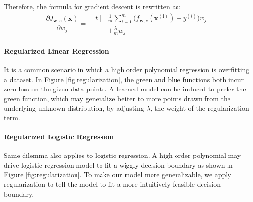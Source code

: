 \documentclass[12pt, twoside]{article}
\begin{document}
\begin{multicols*}{2}
		Therefore, the formula for gradient descent is rewritten as:
		$$ \frac{\partial J_{\mathbf{w},e}(\mathbf{x})}{\partial w_j}=
		\begin{aligned}[t]
			&\frac{1}{m}\sum_{i=1}^{m}\big(f_{\mathbf{w},e}(\mathbf{x^{(i)}})-y^{(i)}\big)w_j \\
			&+\frac{\lambda}{m}w_j
		\end{aligned} $$
		
		\paragraph{Regularized Linear Regression}
		It is a common scenario in which a high order polynomial regression is overfitting a dataset. In Figure \ref{fig:regularization}, the green and blue functions both incur zero loss on the given data points. A learned model can be induced to prefer the green function, which may generalize better to more points drawn from the underlying unknown distribution, by adjusting $\lambda$, the weight of the regularization term.
		
		\paragraph{Regularized Logistic Regression}
		Same dilemma also applies to logistic regression. A high order polynomial may drive logistic regression model to fit a wiggly decision boundary as shown in Figure \ref{fig:regularization}. To make our model more generalizable, we apply regularization to tell the model to fit a more intuitively feasible decision boundary.


\end{multicols*}
\end{document}
